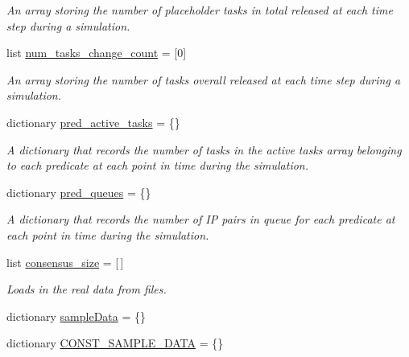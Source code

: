\begin{DoxyCompactItemize}
\begin{DoxyCompactList}\small\item\em An array storing the number of placeholder tasks in total released at each time step during a simulation. \end{DoxyCompactList}\item 
list \mbox{\hyperlink{classdynamicfilterapp_1_1test__simulations_1_1_simulation_test_a7c671c228186999a1381c6879ce6fb33}{num\+\_\+tasks\+\_\+change\+\_\+count}} = \mbox{[}0\mbox{]}
\begin{DoxyCompactList}\small\item\em An array storing the number of tasks overall released at each time step during a simulation. \end{DoxyCompactList}\item 
dictionary \mbox{\hyperlink{classdynamicfilterapp_1_1test__simulations_1_1_simulation_test_a99bc70b457bf163e498bda36817b9b4c}{pred\+\_\+active\+\_\+tasks}} = \{\}
\begin{DoxyCompactList}\small\item\em A dictionary that records the number of tasks in the active tasks array belonging to each predicate at each point in time during the simulation. \end{DoxyCompactList}\item 
dictionary \mbox{\hyperlink{classdynamicfilterapp_1_1test__simulations_1_1_simulation_test_a760f519159d3fa0aab64410908d558e8}{pred\+\_\+queues}} = \{\}
\begin{DoxyCompactList}\small\item\em A dictionary that records the number of IP pairs in queue for each predicate at each point in time during the simulation. \end{DoxyCompactList}\item 
list \mbox{\hyperlink{classdynamicfilterapp_1_1test__simulations_1_1_simulation_test_a3524ef5465572a82fd0b944fe640b1ac}{consensus\+\_\+size}} = \mbox{[}$\,$\mbox{]}
\begin{DoxyCompactList}\small\item\em Loads in the real data from files. \end{DoxyCompactList}\item 
dictionary \mbox{\hyperlink{classdynamicfilterapp_1_1test__simulations_1_1_simulation_test_a4f5e4872dbb438cceaeab80fda954631}{sample\+Data}} = \{\}
\item 
dictionary \mbox{\hyperlink{classdynamicfilterapp_1_1test__simulations_1_1_simulation_test_a1b3f4a822bf543618008e30d49dd9345}{C\+O\+N\+S\+T\+\_\+\+S\+A\+M\+P\+L\+E\+\_\+\+D\+A\+TA}} = \{\}

\end{DoxyCompactItemize}
